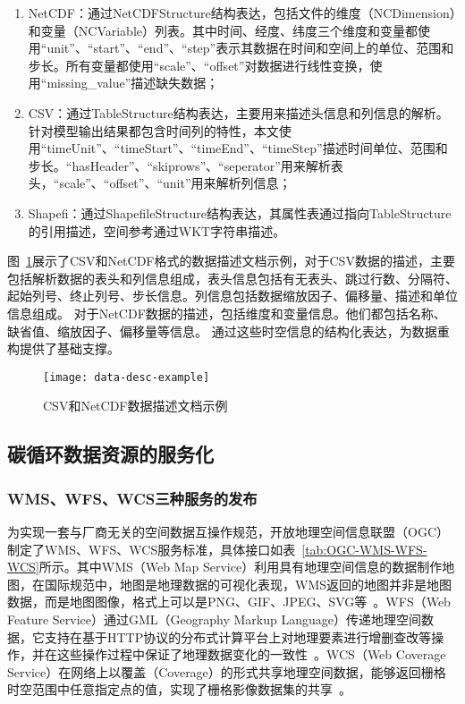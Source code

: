 \begin{enumerate}[(1)]
    \item NetCDF：通过NetCDFStructure结构表达，包括文件的维度（NCDimension）和变量（NCVariable）列表。其中时间、经度、纬度三个维度和变量都使用``unit''、``start''、``end''、``step''表示其数据在时间和空间上的单位、范围和步长。所有变量都使用``scale''、``offset''对数据进行线性变换，使用``missing\_value''描述缺失数据；
    \item CSV：通过TableStructure结构表达，主要用来描述头信息和列信息的解析。针对模型输出结果都包含时间列的特性，本文使用``timeUnit''、``timeStart''、``timeEnd''、``timeStep''描述时间单位、范围和步长。``hasHeader''、``skiprows''、``seperator''用来解析表头，``scale''、``offset''、``unit''用来解析列信息；
    \item Shapefi：通过ShapefileStructure结构表达，其属性表通过指向TableStructure的引用描述，空间参考通过WKT字符串描述。
\end{enumerate}

图~\ref{fig:data-desc-example}展示了CSV和NetCDF格式的数据描述文档示例，对于CSV数据的描述，主要包括解析数据的表头和列信息组成，表头信息包括有无表头、跳过行数、分隔符、起始列号、终止列号、步长信息。列信息包括数据缩放因子、偏移量、描述和单位信息组成。
对于NetCDF数据的描述，包括维度和变量信息。他们都包括名称、缺省值、缩放因子、偏移量等信息。
通过这些时空信息的结构化表达，为数据重构提供了基础支撑。

\begin{figure}[!htbp]
    \centering
    \texttt{[image: data-desc-example]}
    \caption{CSV和NetCDF数据描述文档示例}
    \label{fig:data-desc-example}
\end{figure}

\subsection{碳循环数据资源的服务化}
\label{sec:data-service}
\subsubsection{WMS、WFS、WCS三种服务的发布}
\label{subsubsec:OGC}
为实现一套与厂商无关的空间数据互操作规范，开放地理空间信息联盟（OGC）制定了WMS、WFS、WCS服务标准，具体接口如表~\ref{tab:OGC-WMS-WFS-WCS}所示。其中WMS（Web Map Service）利用具有地理空间信息的数据制作地图，在国际规范中，地图是地理数据的可视化表现，WMS返回的地图并非是地图数据，而是地图图像，格式上可以是PNG、GIF、JPEG、SVG等~\cite{OGC-WMS}。WFS（Web Feature Service）通过GML（Geography Markup Language）传递地理空间数据，它支持在基于HTTP协议的分布式计算平台上对地理要素进行增删查改等操作，并在这些操作过程中保证了地理数据变化的一致性~\cite{OGC-WFS}。WCS（Web Coverage Service）在网络上以覆盖（Coverage）的形式共享地理空间数据，能够返回栅格时空范围中任意指定点的值，实现了栅格影像数据集的共享~\cite{OGC-WCS}。

